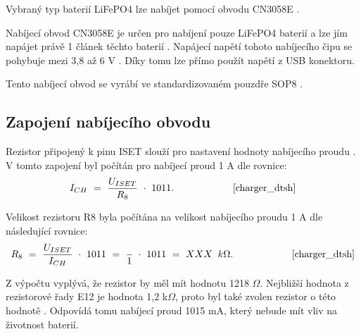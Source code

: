 Vybraný typ baterií LiFePO4 lze nabíjet pomocí obvodu CN3058E \cite{charger_dtsh}. 


Nabíjecí obvod CN3058E je určen pro nabíjení pouze LiFePO4 baterií a lze jím napájet právě 1 článek těchto baterií \cite{charger_dtsh}. Napájecí napětí tohoto 
nabíjecího čipu se pohybuje mezi 3,8 až 6 V \cite{charger_dtsh}. Díky tomu lze přímo použít napětí z USB konektoru. 



Tento nabíjecí obvod se vyrábí ve standardizovaném pouzdře SOP8 \cite{charger_dtsh}.

\subsection{Zapojení nabíjecího obvodu}
Rezistor připojený k pinu ISET slouží pro nastavení hodnoty nabíjecího proudu \cite{charger_dtsh}. V tomto zapojení byl počítán pro nabíjecí proud 1 A dle rovnice: 
\begin{equation} 
  I_{CH}~=~\frac{U_{ISET}}{R_{8}}~\cdot~1011. 
  \quad \quad \quad \quad \quad \quad \cite{charger_dtsh}
\label{eq:I_CH}
\end{equation}



Velikost rezistoru R8 byla počítána na velikost nabíjecího proudu 1 A dle následující rovnice:
\begin{equation} 
  R_{8}~=~\frac{U_{ISET}}{I_{CH}}~\cdot~1011~=~\frac{}{1}~\cdot~1011~=~XXX~\:k\Omega. 
  \quad \quad \quad \quad \quad \quad \cite{charger_dtsh}
\label{eq:I_CH}
\end{equation}


Z výpočtu vyplývá, že rezistor by měl mít hodnotu 1218 $\Omega$. Nejbližší hodnota z rezistorové řady E12 je hodnota 1,2 k$\Omega$, proto byl také zvolen rezistor 
o této hodnotě \cite{rezistorova_rada}. Odpovídá tomu nabíjecí proud 1015 mA, který nebude mít vliv na životnost baterií. 

